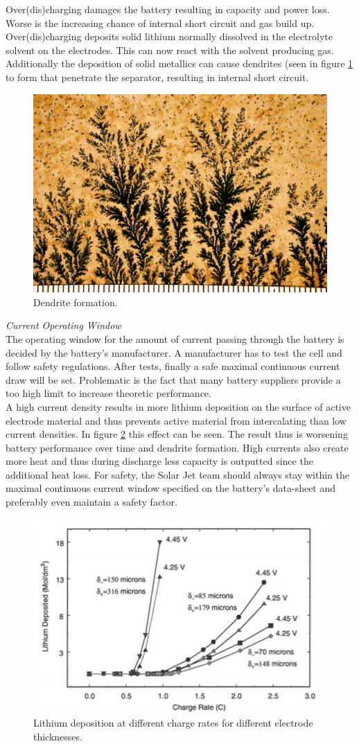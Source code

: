 Over(dis)charging damages the battery resulting in capacity and power loss. Worse is the increasing chance of internal short circuit and gas build up. Over(dis)charging deposits solid lithium normally dissolved in the electrolyte solvent on the electrodes. This can now react with the solvent producing gas. Additionally the deposition of solid metallics can cause dendrites (seen in figure \ref{Fig:Dendrite} to form that penetrate the separator, resulting in internal short circuit\cite{BIRKL2017373}. 
\begin{figure} [H]
	\centering
	\includegraphics[width=0.5\linewidth]{Figures/Dendrites.jpg}
	\caption{Dendrite formation.}
   \label{Fig:Dendrite}
\end{figure}

\textit{Current Operating Window}\\
The operating window for the amount of current passing through the battery is decided by the battery's manufacturer. A manufacturer has to test the cell and follow safety regulations. After tests, finally a safe maximal continuous current draw will be set. Problematic is the fact that many battery suppliers provide a too high limit to increase theoretic performance.\\
A high current density results in more lithium deposition on the surface of active electrode material and thus prevents active material from intercalating than low current densities\cite{Arora19993543}. In figure \ref{Fig:Lithium_deposition} this effect can be seen. The result thus is worsening battery performance over time and dendrite formation. High currents also create more heat and thus during discharge less capacity is outputted since the additional heat loss. For safety, the Solar Jet team should always stay within the maximal continuous current window specified on the battery's data-sheet and preferably even maintain a safety factor. 
\begin{figure} [H]
	\centering
	\includegraphics[width=0.7\linewidth]{Figures/charge_rate.PNG}
	\caption{Lithium deposition at different charge rates for different electrode thicknesses\cite{Arora19993543}.}
   \label{Fig:Lithium_deposition}
\end{figure}

